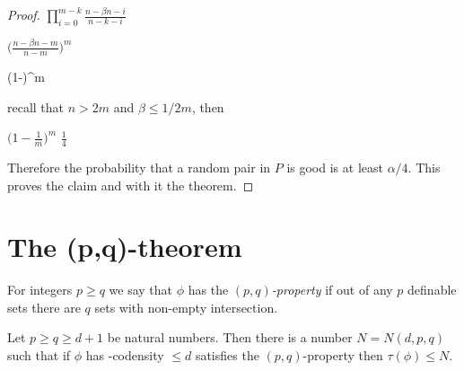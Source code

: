 \documentclass[sputnik.tex]{subfiles}
\begin{document}
\begin{proof}
\medrel{\ge}
$\displaystyle\prod^{m-k}_{i=0}\frac{n-\beta n-i}{n-k-i}$

\medrel{\ge}
$\displaystyle\bigg(\frac{n-\beta n-m}{n-m}\bigg)^m$

\ceq{}{=}
{\bigg(1-\bigg)^m}

\smallskip recall that $n>2m$ and $\beta\le1/2m$, then

\medrel{=}
$\displaystyle\bigg(1-\frac{1}{m}\bigg)^m$
\medrel{\ge}
$\displaystyle\frac{1}{4}$

Therefore the probability that a random pair in $P$ is good is at least $\alpha/4$.
This proves the claim and with it the theorem.
\end{proof}


\section{The (p,q)-theorem}

For integers $p\ge q$ we say that $\phi$ has the \emph{$(p,q)$-property\/} if out of any $p$ definable sets there are $q$ sets with non-empty intersection.

\begin{theorem} Let $p\ge q\ge d+1$ be natural numbers.
Then there is a number $N=N(d,p,q)$ such that if $\phi$ has \vc-codensity $\le d$  satisfies the $(p,q)$-property then $\tau(\phi)\le N$.
\end{theorem}
\end{document}
